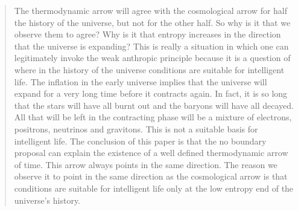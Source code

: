 \begin{quote}
The thermodynamic arrow will agree with the cosmological arrow for half the history of the universe, but not for the other half. So why is it that we observe them to agree? Why is it that entropy increases in the direction that the universe is expanding? This is really a situation in which one can legitimately invoke the weak anthropic principle because it is a question of where in the history of the universe conditions are suitable for intelligent life. The inflation in the early universe implies that the universe will expand for a very long time before it contracts again. In fact, it is so long that the stars will have all burnt out and the baryons will have all decayed. All that will be left in the contracting phase will be a mixture of electrons, positrons, neutrinos and gravitons. This is not a suitable basis for intelligent life.
The conclusion of this paper is that the no boundary proposal can explain the existence of a well defined thermodynamic arrow of time. This arrow always points in the same direction. The reason we observe it to point in the same direction as the cosmological arrow is that conditions are suitable for intelligent life only at the low entropy end of the universe's history.
\end{quote}
